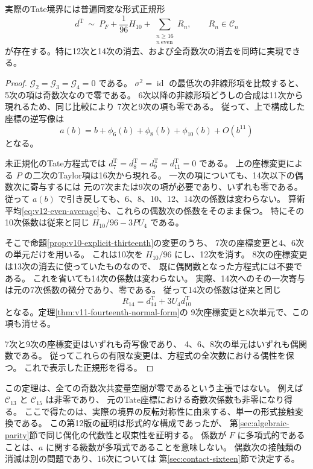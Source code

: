 \begin{corollary}[既存の有限正規化と両立する偶正規形]
\label{cor:v12-even-hessian-normal-form}
実際のTate境界には普遍同変な形式正規形
\begin{equation}\label{eq:v12-even-hessian-normal-form}
 \boxed{\displaystyle
 d^{\mathrm T}\ \sim\
 P_F+\frac1{96}H_{10}
       +\sum_{\substack{n\ge16\\ n\ \mathrm{even}}}R_n,
 \qquad R_n\in\mathcal C_n
 }
\end{equation}
が存在する。特に12次と14次の消去、および全奇数次の消去を同時に実現できる。
\end{corollary}
\begin{proof}
$\mathcal G_2=\mathcal G_3=\mathcal G_4=0$ である。
$\sigma^2=\operatorname{id}$ の最低次の非線形項を比較すると、
5次の項は奇数次なので零である。
6次以降の非線形項どうしの合成は11次から現れるため、同じ比較により
7次と9次の項も零である。
従って、上で構成した座標の逆写像は
\[
 a(b)=b+\phi_6(b)+\phi_8(b)+\phi_{10}(b)+O(b^{11})
\]
となる。

未正規化のTate方程式では
$d^{\mathrm T}_7=d^{\mathrm T}_8=d^{\mathrm T}_9=d^{\mathrm T}_{11}=0$
である。
上の座標変更による $P$ の二次のTaylor項は16次から現れる。
一次の項についても、14次以下の偶数次に寄与するには
元の7次または9次の項が必要であり、いずれも零である。
従って $a(b)$ で引き戻しても、6、8、10、12、14次の係数は変わらない。
算術平均\eqref{eq:v12-even-average}も、これらの偶数次の係数をそのまま保つ。
特にその10次係数は従来と同じ
$H_{10}/96-3PU_4$ である。

そこで命題\ref{prop:v10-explicit-thirteenth}の変更のうち、
7次の座標変更と4、6次の単元だけを用いる。
これは10次を $H_{10}/96$ にし、12次を消す。
8次の座標変更は13次の消去に使っていたものなので、
既に偶関数となった方程式には不要である。
これを省いても14次の係数は変わらない。
実際、14次へのその一次寄与は元の7次係数の微分であり、零である。
従って14次の係数は従来と同じ
\[
 R_{14}=d^{\mathrm T}_{14}+3U_4d^{\mathrm T}_{10}
\]
となる。定理\ref{thm:v11-fourteenth-normal-form}の
9次座標変更と8次単元で、この項も消せる。

7次と9次の座標変更はいずれも奇写像であり、
4、6、8次の単元はいずれも偶関数である。
従ってこれらの有限な変更は、方程式の全次数における偶性を保つ。
これで表示した正規形を得る。
\end{proof}

\begin{remark}[偶性の主張の範囲]
この定理は、全ての奇数次共変量空間が零であるという主張ではない。
例えば $\mathcal C_{13}$ と $\mathcal C_{15}$ は非零であり、
元のTate座標における奇数次係数も非零になり得る。
ここで得たのは、実際の境界の反転対称性に由来する、単一の形式接触変換である。
この第12版の証明は形式的な構成であったが、
第\ref{sec:algebraic-parity}節で同じ偶化の代数性と収束性を証明する。
係数が $F$ に多項式的であることは、$a$ に関する級数が多項式であることを意味しない。
偶数次の接触類の消滅は別の問題であり、16次については
第\ref{sec:contact-sixteen}節で決定する。
\end{remark}

